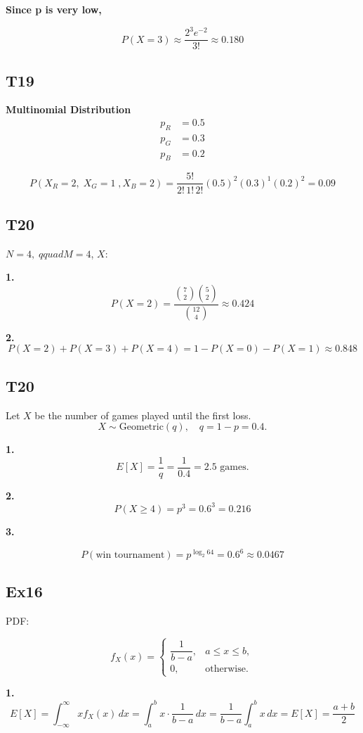 \documentclass[12pt, a4paper]{article}
\begin{document}
\textbf{Since p is very low, }

\[
P(X=3) \approx \frac{2^3 e^{-2}}{3!} \approx 0.180
\]


\subsection* {T19}
\textbf{Multinomial Distribution}
\begin{align*}
p_R &= 0.5 \\
p_G &= 0.3 \\
p_B &= 0.2
\end{align*}

\[
P(X_R = 2, \; X_G = 1 \;, X_B = 2 ) = \frac{5!}{2!\,1!\,2!} (0.5)^2 (0.3)^1 (0.2)^2 = \boxed{0.09}
\]

\subsection* {T20}
$N = 4, \;qquad M = 4$, $X$: 

\textbf{1. }
\[
P(X = 2)= \frac{\binom{7}{2}\binom{5}{2}}{\binom{12}{4}} \approx \boxed{0.424}
\]

\textbf{2. }
\[
P(X = 2) + P(X = 3) + P(X = 4) = 1 - P(X = 0) - P(X = 1) \approx \boxed{0.848}
\]
\subsection* {T20}
Let $X$ be the number of games played until the first loss.
\[
X \sim \text{Geometric}(q), \quad q = 1-p = 0.4.
\]

\textbf{1. }
\[
E[X] = \frac{1}{q} = \frac{1}{0.4} = \boxed{2.5 \text{ games.}}
\]

\textbf{2. }
\[
P(X \ge 4) = p^3 = 0.6^3 = \boxed{0.216}
\]

\textbf{3. }

\[
P(\text{win tournament}) = p^{\log_2 64} = 0.6^6 \approx 0.0467
\]


\subsection* {Ex16}
PDF:

\[
f_X(x) =
\begin{cases}
\dfrac{1}{b-a}, & a \le x \le b, \\[2mm]
0, & \text{otherwise}.
\end{cases}
\]

\textbf{1. }
\[
E[X] = \int_{-\infty}^{\infty} x f_X(x) \, dx
= \int_a^b x \cdot \frac{1}{b-a} \, dx
= \frac{1}{b-a} \int_a^b x \, dx = \boxed{E[X] = \frac{a+b}{2}}
\]
\end{document}
